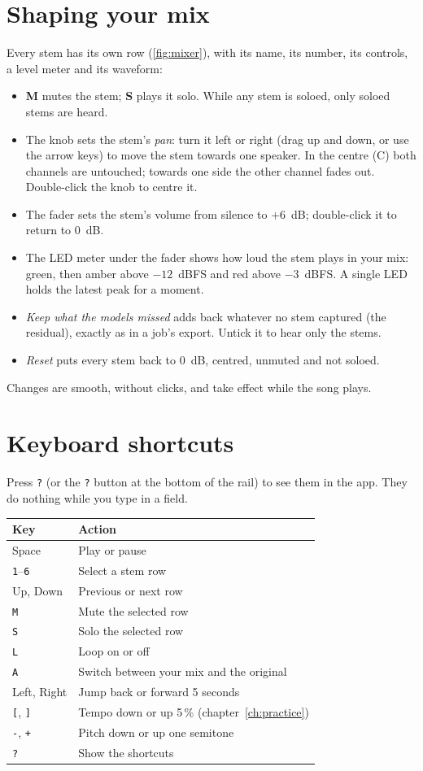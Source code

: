 \documentclass{covermaker}
\begin{document}
\section{Shaping your mix}
Every stem has its own row (\autoref{fig:mixer}), with its name, its number,
its controls, a level meter and its waveform:
\begin{itemize}
  \item \textbf{M} mutes the stem; \textbf{S} plays it solo. While any stem is
        soloed, only soloed stems are heard.
  \item The knob sets the stem's \emph{pan}: turn it left or right (drag up
        and down, or use the arrow keys) to move the stem towards one
        speaker. In the centre (\textsf{C}) both channels are untouched;
        towards one side the other channel fades out. Double-click the knob
        to centre it.
  \item The fader sets the stem's volume from silence to +6~dB; double-click
        it to return to 0~dB.
  \item The LED meter under the fader shows how loud the stem plays in your
        mix: green, then amber above $-12$~dBFS and red above $-3$~dBFS. A
        single LED holds the latest peak for a moment.
  \item \emph{Keep what the models missed} adds back whatever no stem captured
        (the residual), exactly as in a job's export. Untick it to hear only
        the stems.
  \item \emph{Reset} puts every stem back to 0~dB, centred, unmuted and not
        soloed.
\end{itemize}
Changes are smooth, without clicks, and take effect while the song plays.

\section{Keyboard shortcuts}
Press \texttt{?} (or the \texttt{?} button at the bottom of the rail) to see
them in the app. They do nothing while you type in a field.

\begin{tabularx}{\linewidth}{@{}lY@{}}
\toprule
\textbf{Key} & \textbf{Action} \\
\midrule
Space & Play or pause \\
\texttt{1}--\texttt{6} & Select a stem row \\
Up, Down & Previous or next row \\
\texttt{M} & Mute the selected row \\
\texttt{S} & Solo the selected row \\
\texttt{L} & Loop on or off \\
\texttt{A} & Switch between your mix and the original \\
Left, Right & Jump back or forward 5 seconds \\
\texttt{[}, \texttt{]} & Tempo down or up 5\,\% (chapter~\ref{ch:practice}) \\
\texttt{-}, \texttt{+} & Pitch down or up one semitone \\
\texttt{?} & Show the shortcuts \\
\bottomrule
\end{tabularx}
\end{document}
